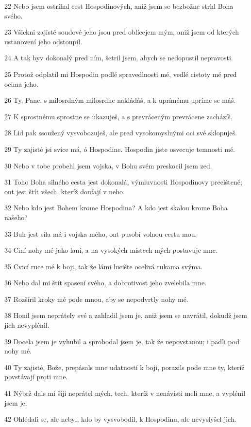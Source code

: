 \par 22 Nebo jsem ostríhal cest Hospodinových, aniž jsem se bezbožne strhl Boha svého.
\par 23 Všickni zajisté soudové jeho jsou pred oblícejem mým, aniž jsem od kterých ustanovení jeho odstoupil.
\par 24 A tak byv dokonalý pred ním, šetril jsem, abych se nedopustil nepravosti.
\par 25 Protož odplatil mi Hospodin podlé spravedlnosti mé, vedlé cistoty mé pred ocima jeho.
\par 26 Ty, Pane, s milosrdným milosrdne nakládáš, a k uprímému upríme se máš.
\par 27 K sprostnému sprostne se ukazuješ, a s prevráceným prevrácene zacházíš.
\par 28 Lid pak ssoužený vysvobozuješ, ale pred vysokomyslnými oci své sklopuješ.
\par 29 Ty zajisté jsi svíce má, ó Hospodine. Hospodin jiste osvecuje temnosti mé.
\par 30 Nebo v tobe probehl jsem vojska, v Bohu svém preskocil jsem zed.
\par 31 Toho Boha silného cesta jest dokonalá, výmluvnosti Hospodinovy precištené; ont jest štít všech, kteríž doufají v neho.
\par 32 Nebo kdo jest Bohem krome Hospodina? A kdo jest skalou krome Boha našeho?
\par 33 Buh jest síla má i vojska mého, ont pusobí volnou cestu mou.
\par 34 Ciní nohy mé jako laní, a na vysokých místech mých postavuje mne.
\par 35 Cvicí ruce mé k boji, tak že lámi lucište ocelivá rukama svýma.
\par 36 Nebo dal mi štít spasení svého, a dobrotivost jeho zvelebila mne.
\par 37 Rozšíril kroky mé pode mnou, aby se nepodvrtly nohy mé.
\par 38 Honil jsem neprátely své a zahladil jsem je, aniž jsem se navrátil, dokudž jsem jich nevyplénil.
\par 39 Docela jsem je vyhubil a sprobodal jsem je, tak že nepovstanou; i padli pod nohy mé.
\par 40 Ty zajisté, Bože, prepásals mne udatností k boji, porazils pode mne ty, kteríž povstávají proti mne.
\par 41 Nýbrž dals mi šíji neprátel mých, tech, kteríž v nenávisti meli mne, a vyplénil jsem je.
\par 42 Ohlédali se, ale nebyl, kdo by vysvobodil, k Hospodinu, ale nevyslyšel jich.
